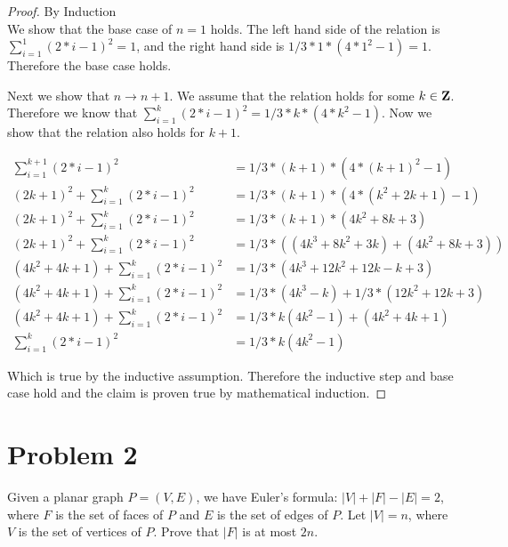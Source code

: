 \documentclass[11pt]{article}
\begin{document}
\begin{proof}
By Induction\\

We show that the base case of $n = 1$ holds. The left hand side of the relation is $\sum_{i=1}^1(2 * i - 1) ^2 = 1$, and the right hand side is $1/3 * 1 * (4 * 1^2 - 1) = 1$. Therefore the base case holds. 

Next we show that $n \rightarrow n + 1$. We assume that the relation holds for some $k \in \mathbf{Z}$. Therefore we know that $\sum_{i=1}^k  (2 * i - 1) ^2 = 1/3 * k * (4 * k^2 - 1)$. Now we show that the relation also holds for $k + 1$. 

\begin{equation*}
\begin{split}
\sum_{i=1}^{k+1}  (2 * i - 1) ^2 & = 1/3 * (k + 1) * (4 * (k+1)^2 - 1)\\
(2k + 1)^2 + \sum_{i=1}^{k}  (2 * i - 1) ^2 & = 1/3 * (k + 1) * (4 * (k^2 + 2k + 1) - 1)\\
(2k + 1)^2 + \sum_{i=1}^{k}  (2 * i - 1) ^2 & = 1/3 * (k + 1) * (4k^2 + 8k + 3)\\
(2k + 1)^2 + \sum_{i=1}^{k}  (2 * i - 1) ^2 & = 1/3 * ((4k^3 + 8k^2 + 3k) + (4k^2 + 8k + 3))\\
(4k^2 + 4k + 1) + \sum_{i=1}^{k}  (2 * i - 1) ^2 & = 1/3 * (4k^3 + 12k^2 + 12k - k + 3)\\
(4k^2 + 4k + 1) + \sum_{i=1}^{k}  (2 * i - 1) ^2 & = 1/3 * (4k^3 - k) + 1/3 * (12k^2 + 12k + 3)\\
(4k^2 + 4k + 1) + \sum_{i=1}^{k}  (2 * i - 1) ^2 & = 1/3 * k(4k^2 - 1) + (4k^2 + 4k + 1)\\
\sum_{i=1}^{k}  (2 * i - 1) ^2 & = 1/3 * k(4k^2 - 1)
\end{split}
\end{equation*}

Which is true by the inductive assumption. Therefore the inductive step and base case hold and the claim is proven true by mathematical induction.

\end{proof}

\newpage
\section*{Problem 2}

Given a planar graph $P=(V,E)$, we have Euler's formula:
$|V|+|F|-|E|=2$, where $F$ is the set of faces of $P$ and $E$ is the
set of edges of $P$.
Let $|V|=n$, where $V$ is the set of vertices of $P$.
Prove that $|F|$ is at most $2n$.
\newline
\end{document}
